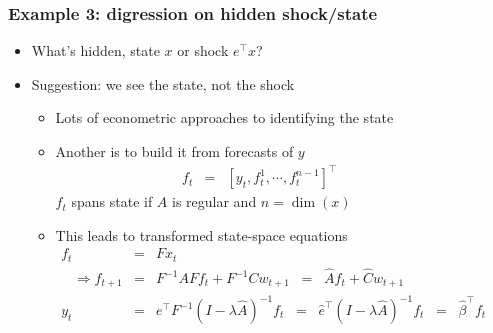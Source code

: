 \documentclass{beamer}
\begin{document}
\begin{frame}
\frametitle{Example 3: digression on hidden shock/state}
\begin{itemize}  \itemsep=\bigskipamount
\item What's hidden, state $x$ or shock $e^\top x$?
\item Suggestion:  we see the state, not the shock  \\
\begin{itemize} \bigskipamount
\item Lots of econometric approaches to identifying the state \\
\item Another is to build it from forecasts of $y$
\begin{eqnarray*}
    f_t &=& [ y_t, f^1_t, \cdots, f^{n-1}_t ]^\top
            \phantom{xxxxxx}
\end{eqnarray*}
$f_t$ spans state if $A$ is regular and $n = \dim(x)$
\item This leads to transformed state-space equations
\begin{eqnarray*}
    f_t &=&  F x_t  \\
    \;\;\; \Rightarrow
    f_{t+1} &=& F^{-1} A F f_t + F^{-1} C w_{t+1}
        \;\;=\;\; \widehat{A} f_{t} + \widehat{C} w_{t+1} \\
    y_t &=& e^\top F^{-1} (I-\lambda \widehat{A})^{-1} f_t
            \;\;=\;\;
            \widehat{e}^\top (I-\lambda \widehat{A})^{-1} f_t \;\;=\;\; \widehat{\beta}^{\top} f_t
            \phantom{xxxxxxxxxx}
\end{eqnarray*}
\end{itemize}
\end{itemize}
\end{frame}
\end{document}

